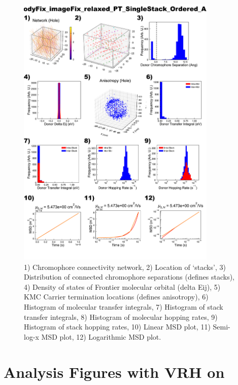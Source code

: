 \documentclass[12pt]{article}
\begin{document}
\begin{figure}[h]\centering
	\includegraphics[width=0.85\textwidth]{Figures/bodyFix_imageFix_relaxed_PT_SingleStack_Ordered_AA.png}
    \caption{   1) Chromophore connectivity network, 
                2) Location of `stacks', 
                3) Distribution of connected chromophore separations (defines stacks),
                4) Density of states of Frontier molecular orbital (delta Eij),
                5) KMC Carrier termination locations (defines anisotropy),
                6) Histogram of molecular transfer integrals,
                7) Histogram of stack transfer integrals,
                8) Histogram of molecular hopping rates,
                9) Histogram of stack hopping rates,
                10) Linear MSD plot,
                11) Semi-log-x MSD plot,
                12) Logarithmic MSD plot.}
	\label{fig:PTSingOrd}
\end{figure}

\clearpage
\section{Analysis Figures with VRH on}
\end{document}
